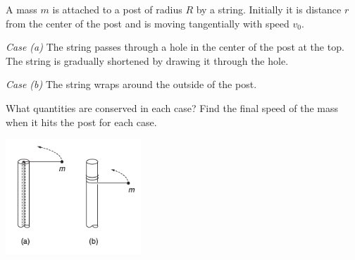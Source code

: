 \documentclass[12pt,letterpaper]{hmcpset}
\begin{document}
\begin{solution}
    \vfill
\end{solution}
\clearpage

\begin{problem}
    A mass $m$ is attached to a post of radius $R$
    by a string. Initially it is distance $r$ from
    the center of the post and is moving tangentially
    with speed $v_{0}$.

    \emph{Case (a)} The string passes through a hole 
    in the center of the post at the top. The string
    is gradually shortened by drawing it through the hole.

    \emph{Case (b)} The string wraps around the outside
    of the post. 
 
    What quantities are conserved in each case? Find 
    the final speed of the mass when it hits the post
    for each case.

    \begin{center}
        \includegraphics[width=2in]{img/7_13}
    \end{center}
\end{problem}

\begin{solution}
    \vfill
\end{solution}
\clearpage
\end{document}
